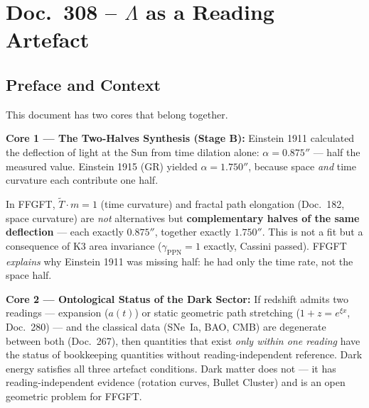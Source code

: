 \maketitle
\tableofcontents

\chapter*{Doc.~308 -- $\Lambda$ as a Reading Artefact}

\section*{Preface and Context}

This document has two cores that belong together.

\medskip
\noindent\textbf{Core 1 — The Two-Halves Synthesis (Stage B):}
Einstein 1911 calculated the deflection of light at the Sun from
time dilation alone: $\alpha = 0.875''$ — half the measured value.
Einstein 1915 (GR) yielded $\alpha = 1.750''$, because space
\emph{and} time curvature each contribute one half.

In FFGFT, $\tilde T \cdot m = 1$ (time curvature) and fractal path
elongation (Doc.~182, space curvature) are \emph{not} alternatives
but \textbf{complementary halves of the same deflection} — each
exactly $0.875''$, together exactly $1.750''$. This is not a fit but
a consequence of K3 area invariance ($\gamma_\text{PPN} = 1$ exactly,
Cassini passed). FFGFT \emph{explains} why Einstein 1911 was missing
half: he had only the time rate, not the space half.

\medskip
\noindent\textbf{Core 2 — Ontological Status of the Dark Sector:}
If redshift admits two readings — expansion ($a(t)$) or static
geometric path stretching ($1+z = e^{\xi x}$, Doc.~280) — and the
classical data (SNe~Ia, BAO, CMB) are degenerate between both
(Doc.~267), then quantities that exist \emph{only within one reading}
have the status of bookkeeping quantities without reading-independent
reference.
Dark energy satisfies all three artefact conditions. Dark matter does
not — it has reading-independent evidence (rotation curves, Bullet
Cluster) and is an open geometric problem for FFGFT.

